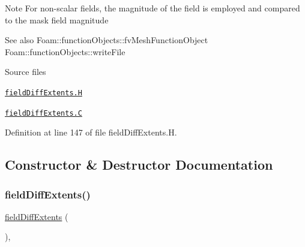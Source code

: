 \begin{DoxyNote}{Note}
For non-\/scalar fields, the magnitude of the field is employed and compared to the mask field magnitude
\end{DoxyNote}
\begin{DoxySeeAlso}{See also}
Foam\+::function\+Objects\+::fv\+Mesh\+Function\+Object Foam\+::function\+Objects\+::write\+File
\end{DoxySeeAlso}
\begin{DoxyParagraph}{Source files}

\begin{DoxyItemize}
\item \href{../../../home/carlo/data/GeN-Foam/GeN-Foam_ffn/GeN-Foam/GeN-Foam/classes/thermalHydraulics/src/functionObjects/fieldDiffExtents/fieldDiffExtents.H}{\tt field\+Diff\+Extents.\+H} 
\item \href{../../../home/carlo/data/GeN-Foam/GeN-Foam_ffn/GeN-Foam/GeN-Foam/classes/thermalHydraulics/src/functionObjects/fieldDiffExtents/fieldDiffExtents.C}{\tt field\+Diff\+Extents.\+C} 
\end{DoxyItemize}
\end{DoxyParagraph}


Definition at line 147 of file field\+Diff\+Extents.\+H.



\subsection{Constructor \& Destructor Documentation}
\mbox{\label{classFoam_1_1functionObjects_1_1fieldDiffExtents_a1c8b31c50bb5c96167119b99a0ce2b72}} 
\subsubsection{\texorpdfstring{field\+Diff\+Extents()}{fieldDiffExtents()}\hspace{0.1cm}{\footnotesize\ttfamily [1/2]}}
{\footnotesize\ttfamily \hyperlink{classFoam_1_1functionObjects_1_1fieldDiffExtents}{field\+Diff\+Extents} (\begin{DoxyParamCaption}\item[{const \hyperlink{classFoam_1_1functionObjects_1_1fieldDiffExtents}{field\+Diff\+Extents} \&}]{ }\end{DoxyParamCaption})\hspace{0.3cm}{\ttfamily [protected]}, {\ttfamily [delete]}}



